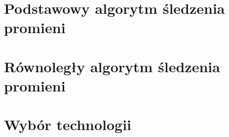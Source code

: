 \section{Podstawowy algorytm śledzenia promieni}
\section{Równoległy algorytm śledzenia promieni}
\section{Wybór technologii}
